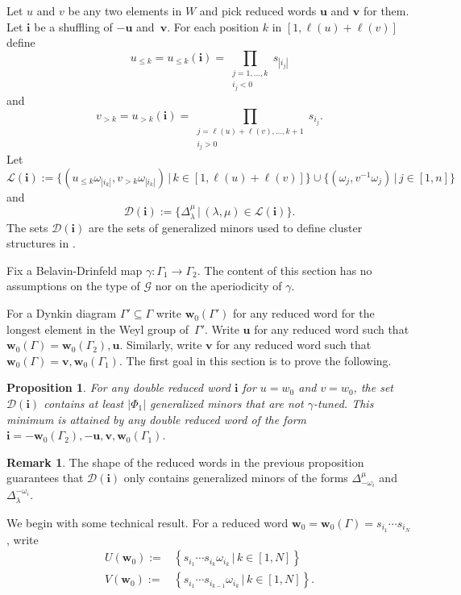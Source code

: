 \documentclass[a4paper]{amsart}
\newtheorem{proposition}[theorem]{Proposition}
\theoremstyle{definition}
\newtheorem{remark}[theorem]{Remark}
\newcommand{\mcG}{\mathcal{G}}
\newcommand{\mcL}{\mathcal{L}}
\newcommand{\mcD}{\mathcal{D}}
\newcommand{\bfi}{\mathbf{i}}
\newcommand{\bfu}{\mathbf{u}}
\newcommand{\bfv}{\mathbf{v}}
\newcommand{\bfw}{\mathbf{w}}
\begin{document}
Let $u$ and $v$ be any two elements in $W$ and pick reduced words $\bfu$ and $\bfv$ for them.
Let $\bfi$ be a shuffling of $-\bfu$ and~$\bfv$.
For each position $k$ in $[1, \ell(u)+\ell(v)]$ define
\[
  u_{\leq k}
  =
  u_{\leq k}(\bfi)
  =
  \prod_{\substack{j= 1,\dots,k \\ i_j < 0}} s_{|i_j|}
\]
and
\[
  v_{> k}
  =
  u_{> k}(\bfi)
  =
  \prod_{\substack{j = \ell(u)+\ell(v),\dots,k+1 \\ i_j > 0}} s_{i_j}.
\]
Let
\[
  \mcL(\bfi)
  :=
  \Big\{
    (u_{\leq k} \omega_{|i_k|},v_{> k}\omega_{|i_k|}) \, \Big| \, k\in[1,\ell(u)+\ell(v)]
  \Big\}
  \cup
  \Big\{(\omega_j,v^{-1}\omega_j) \,\Big|\, j \in [1,n] \Big\}
\]
and
\[
  \mcD(\bfi)
  :=
  \Big\{
    \Delta_\lambda^\mu \,\Big|\, (\lambda,\mu) \in \mcL(\bfi)
  \Big\}.
\]
The sets $\mcD(\bfi)$ are the sets of generalized minors used to define cluster structures in \cite{BFZ05}.

Fix a Belavin-Drinfeld map $\gamma:\Gamma_1\rightarrow\Gamma_2$.
The content of this section has no assumptions on the type of $\mcG$ nor on the aperiodicity of $\gamma$.

For a Dynkin diagram $\Gamma'\subseteq\Gamma$ write $\bfw_0(\Gamma')$ for any reduced word for the longest element in the Weyl group of~$\Gamma'$.
Write $\bfu$ for any reduced word such that $\bfw_0(\Gamma) = \bfw_0(\Gamma_2), \bfu$.
Similarly, write $\bfv$ for any reduced word such that $\bfw_0(\Gamma) = \bfv, \bfw_0(\Gamma_1)$.
The first goal in this section is to prove the following.
\begin{proposition}
  \label{prop: max compatible}
  For any double reduced word $\bfi$ for $u=w_0$ and $v=w_0$, the set $\mcD(\bfi)$ contains at least $|\Phi_1|$ generalized minors that are not $\gamma$-tuned.
  This minimum is attained by any double reduced word of the form $\bfi = -\bfw_0(\Gamma_2), -\bfu, \bfv, \bfw_0(\Gamma_1)$.
\end{proposition}

\begin{remark}
  The shape of the reduced words in the previous proposition guarantees that $\mcD(\bfi)$ only contains generalized minors of the forms $\Delta_{-\omega_i}^\mu$ and $\Delta_\lambda^{-\omega_i}$.
\end{remark}

We begin with some technical result.
For a reduced word $\bfw_0=\bfw_0(\Gamma)=s_{i_1}\cdots s_{i_N}$, write
\begin{align*}
  U(\bfw_0):=&\left\{s_{i_1}\cdots s_{i_k}\omega_{i_k} \,|\, k\in[1,N]\right\}\\
  V(\bfw_0):=&\left\{s_{i_1}\cdots s_{i_{k-1}}\omega_{i_k} \,|\, k\in[1,N]\right\}.
\end{align*}
\end{document}

